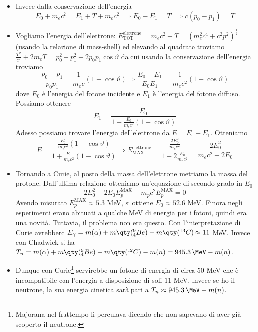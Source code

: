   \begin{itemize}
  \item Invece dalla conservazione dell'energia
  \begin{equation*}
      E_0+m_ec^2=E_1+T+m_ec^2\implies E_0-E_1=T\implies c(p_0-p_1)=T
  \end{equation*}
  \item Vogliamo l'energia dell'elettrone: $E_{\text{TOT}}^{\text{elettrone}}=m_ec^2+T=(m_e^2c^4+c^2p^2)^{\frac12}$ (usando la relazione di mass-shell) ed elevando al quadrato troviamo $\frac{T^2}{c^2}+2m_eT=p_0^2+p_1^2-2p_0p_1\cos\vartheta$ da cui usando la conservazione dell'energia troviamo
  \begin{equation*}
    \frac{p_0-p_1}{p_0p_1}=\frac1{m_ec}(1-\cos\vartheta)\Rightarrow \frac{E_0-E_1}{E_0E_1}=\frac1{m_ec^2}(1-\cos\vartheta)
  \end{equation*}
  dove $E_0$ è l'energia del fotone incidente e $E_1$ è l'energia del fotone diffuso. Possiamo ottenere 
  \begin{equation*}
    E_1 = \frac{E_0}{1+\frac{E_0}{m_ec^2}(1-\cos\vartheta)}
  \end{equation*}
Adesso possiamo trovare l'energia dell'elettrone da $E=E_0-E_1$. Otteniamo
\begin{equation*}
    E=\frac{\frac{E_0^2}{m_ec^2}(1-\cos\vartheta)}{1+\frac{E_0}{m_ec^2}(1-\cos\vartheta)}\Rightarrow E_{\text{MAX}}^{\text{elettrone}}=\frac{\frac{2E_0^2}{m_ec^2}}{1+2\frac{E_0}{m_ec^2}}=\frac{2E_0^2}{m_ec^2+2E_0}
\end{equation*}
    \item Tornando a Curie, al posto della massa dell'elettrone mettiamo la massa del protone. Dall'ultima relazione otteniamo un'equazione di secondo grado in $E_0$
    \begin{equation*}
        2E_0^2-2E_0E_p^{\text{MAX}}-m_pc^2E_p^{\text{MAX}}=0
    \end{equation*}
    Avendo misurato $E_p^{\text{MAX}}\approx 5.3$ MeV, si ottiene $E_0\approx 52.6$ MeV. Finora negli esperimenti erano abituati a qualche MeV di energia per i fotoni, quindi era una novità. Tuttavia, il problema non era questo. Con l'interpretazione di Curie avrebbero $E_\gamma=m(\alpha)+m\qty(^9_4Be)-m\qty(^{13}C)\approx 11$ MeV. Invece con Chadwick si ha $T_n=m(\alpha)+m\qty(^9_4Be)-m\qty(^{12}C)- m(n)=945.3 \,\MeV - m(n)$.
\item Dunque con Curie\footnote{Majorana nel frattempo li perculava dicendo che non sapevano di aver già scoperto il neutrone.} servirebbe un fotone di energia di circa $50$ MeV che è incompatibile con l'energia a disposizione di soli $11$ MeV. Invece se ho il neutrone, la sua energia cinetica sarà pari a $T_n\approx 945.3 \,\MeV - m(n)$.
\end{itemize}
